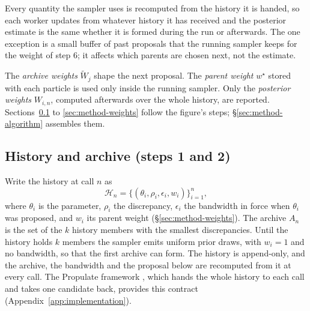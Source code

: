 \documentclass[10pt]{article}
\theoremstyle{plain}
\theoremstyle{definition}
\begin{document}
Every quantity the sampler uses is recomputed from the history it is handed, so each worker updates from whatever history it has received and the posterior estimate is the same whether it is formed during the run or afterwards. The one exception is a small buffer of past proposals that the running sampler keeps for the weight of step 6; it affects which parents are chosen next, not the estimate.

The \emph{archive weights} $\tilde W_j$ shape the next proposal. The \emph{parent weight} $w^\star$ stored with each particle is used only inside the running sampler. Only the \emph{posterior weights} $W_{i,n}$, computed afterwards over the whole history, are reported. Sections~\ref{sec:method-history} to \ref{sec:method-weights} follow the figure's steps; \S\ref{sec:method-algorithm} assembles them.

\subsection{History and archive (steps 1 and 2)}\label{sec:method-history}
Write the history at call $n$ as
\begin{equation}
\mathcal{H}_n = \bigl\{(\theta_i,\rho_i,\epsilon_i,w_i)\bigr\}_{i=1}^{n},
\label{eq:history}
\end{equation}
where $\theta_i$ is the parameter, $\rho_i$ the discrepancy, $\epsilon_i$ the bandwidth in force when $\theta_i$ was proposed, and $w_i$ its parent weight (\S\ref{sec:method-weights}). The archive $A_n$ is the set of the $k$ history members with the smallest discrepancies. Until the history holds $k$ members the sampler emits uniform prior draws, with $w_i=1$ and no bandwidth, so that the first archive can form. The history is append-only, and the archive, the bandwidth and the proposal below are recomputed from it at every call. The Propulate framework \citep{taubert2023propulate}, which hands the whole history to each call and takes one candidate back, provides this contract (Appendix~\ref{app:implementation}).
\end{document}
